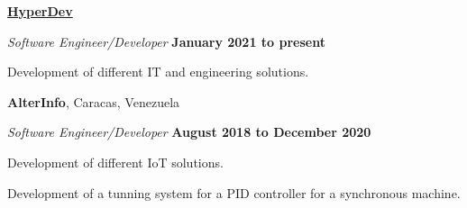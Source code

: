 \documentclass[10pt]{article}
\begin{document}
\href{https://hypedev.design/}{\textbf{HyperDev}}
\begin{outerlist}
    \item[] \textit{Software Engineer/Developer}
            \hfill \textbf{January 2021 to present}
            \begin{innerlist}
                \item Development of different IT and engineering solutions.
            \end{innerlist}

\end{outerlist}

\textbf{AlterInfo}, Caracas, Venezuela
\begin{outerlist}
    \item[] \textit{Software Engineer/Developer}%
            \hfill \textbf{August 2018 to December 2020}
            \begin{innerlist}
                \item Development of different IoT solutions.
                \item Development of a tunning system for a PID controller for a synchronous machine.
            \end{innerlist}
\end{outerlist}
\end{document}
